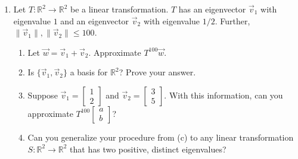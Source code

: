 \documentclass[red]{tutorial}
\newcommand{\R}{\mathbb{R}}
\newcommand{\mat}[1]{\begin{bmatrix}#1\end{bmatrix}}
\theoremstyle{definition}
\theoremstyle{theorem}
\begin{document}
\begin{tutorial}
\begin{enumerate}
	\item Let $T:\R^2\to\R^2$ be a linear transformation. $T$ has an eigenvector $\vec v_1$ with eigenvalue $1$
		and an eigenvector $\vec v_2$ with eigenvalue $1/2$. Further, $\|\vec v_1\|,\|\vec v_2\|\leq 100$.
		\begin{enumerate}
			\item Let $\vec w=\vec v_1+\vec v_2$. Approximate $T^{100}\vec w$.
			\item Is $\{\vec v_1,\vec v_2\}$ a basis for $\R^2$? Prove your answer.
			\item Suppose $\vec v_1=\mat{1\\2}$ and $\vec v_2=\mat{3\\5}$. With this information,
				can you approximate $T^{100}\mat{a\\b}$?
			\item Can you generalize your procedure from (c) to any linear transformation $S:\R^2\to\R^2$
				that has two positive, distinct eigenvalues?
		\end{enumerate}

\end{enumerate}
	\end{tutorial}
\end{document}
